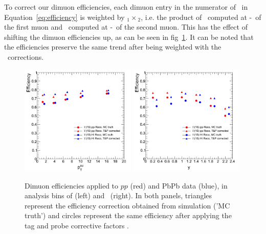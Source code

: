 To correct our dimuon efficiencies, each dimuon entry in the numerator of \eff\ in
Equation~\ref{eq:efficiency} is weighted by \Ctnp$_1\times$\Ctnp$_2$,
i.e. the product of \Ctnp\
computed at \pt-\Pgh\ of the first muon and \Ctnp\ computed at
\pt-\Pgh\ of the second muon. This has the effect of shifting the
dimuon efficiencies up, as can be seen in fig~\ref{fig:dimueff_SF}. It
can be noted that the efficiencies preserve the same trend after being
weighted with the \Ctnp\ corrections.

\begin{figure}
  \begin{center}
    \includegraphics[width=0.49\textwidth]{Chapters/aCorrection/TnPCorrection_Pt.png}
    \includegraphics[width=0.49\textwidth]{Chapters/aCorrection/TnPCorrection_Rap.png}
    \caption{
      Dimuon efficiencies applied to $pp$ (red) and PbPb data
      (blue), in analysis bins of \pt (left) and \y\ (right). In both
      panels, triangles represent the efficiency correction obtained
      from simulation ('MC truth') and circles represent the
      same efficiency after applying the tag and probe corrective
      factors \Ctnp.
    }
    \label{fig:dimueff_SF}
  \end{center}
\end{figure}


